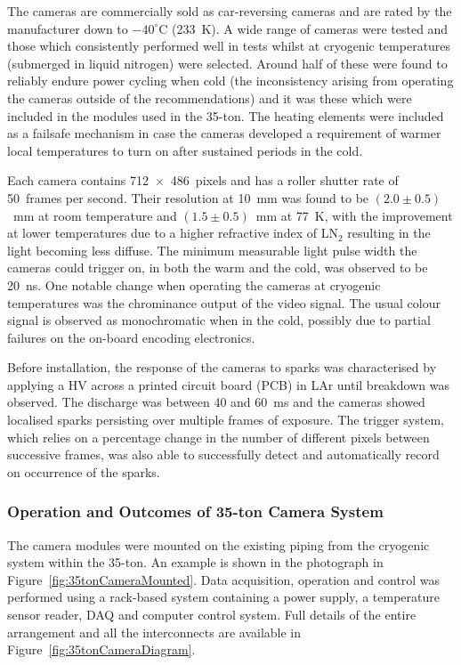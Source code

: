 The cameras are commercially sold as car-reversing cameras and are rated by the manufacturer down to $-40^{\circ}$C (233~K).  A wide range of cameras were tested and those which consistently performed well in tests whilst at cryogenic temperatures (submerged in liquid nitrogen) were selected.  Around half of these were found to reliably endure power cycling when cold (the inconsistency arising from operating the cameras outside of the recommendations) and it was these which were included in the modules used in the 35-ton.  The heating elements were included as a failsafe mechanism in case the cameras developed a requirement of warmer local temperatures to turn on after sustained periods in the cold.

Each camera contains 712~$\times$~486~pixels and has a roller shutter rate of 50~frames per second.  Their resolution at 10~mm was found to be $(2.0\pm0.5)$~mm at room temperature and $(1.5\pm0.5)$~mm at 77~K, with the improvement at lower temperatures due to a higher refractive index of LN$_2$ resulting in the light becoming less diffuse.  The minimum measurable light pulse width the cameras could trigger on, in both the warm and the cold, was observed to be 20~ns.  One notable change when operating the cameras at cryogenic temperatures was the chrominance output of the video signal.  The usual colour signal is observed as monochromatic when in the cold, possibly due to partial failures on the on-board encoding electronics.

Before installation, the response of the cameras to sparks was characterised by applying a HV across a printed circuit board (PCB) in LAr until breakdown was observed.  The discharge was between 40 and 60~ms and the cameras showed localised sparks persisting over multiple frames of exposure.  The trigger system, which relies on a percentage change in the number of different pixels between successive frames, was also able to successfully detect and automatically record on occurrence of the sparks.

\subsubsection{Operation and Outcomes of 35-ton Camera System}\label{sec:35tonCameraSystemOperation}

The camera modules were mounted on the existing piping from the cryogenic system within the 35-ton.  An example is shown in the photograph in Figure~\ref{fig:35tonCameraMounted}.  Data acquisition, operation and control was performed using a rack-based system containing a power supply, a temperature sensor reader, DAQ and computer control system.  Full details of the entire arrangement and all the interconnects are available in Figure~\ref{fig:35tonCameraDiagram}.

